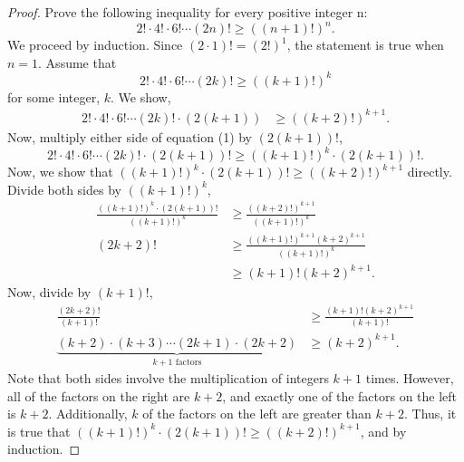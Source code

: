 \documentclass[12pt]{article}
\begin{document}
    \begin{proof}{Prove the following inequality for every positive integer n:\begin{equation*}
        2!\cdot4!\cdot6!\cdots(2n)!\geq((n+1)!)^n.
    \end{equation*}}
        We proceed by induction. Since \((2\cdot1)!=(2!)^1\), the statement is true when \(n=1\). Assume that
        \begin{equation}
            2!\cdot4!\cdot6!\cdots(2k)!\geq((k+1)!)^k
        \end{equation}
        for some integer, \(k\). We show,
        \begin{equation*}
            \begin{split}
                2!\cdot4!\cdot6!\cdots(2k)!\cdot(2(k+1))&\geq((k+2)!)^{k+1}.
            \end{split}
        \end{equation*}
        Now, multiply either side of equation (1) by \((2(k+1))!\),
        \begin{equation*}
            2!\cdot4!\cdot6!\cdots(2k)!\cdot(2(k+1))!\geq((k+1)!)^k\cdot(2(k+1))!.
        \end{equation*}
        Now, we show that \(((k+1)!)^k\cdot(2(k+1))!\geq((k+2)!)^{k+1}\) directly. Divide both sides by \(((k+1)!)^k\),
        \begin{equation*}
            \begin{split}
                \frac{((k+1)!)^k\cdot(2(k+1))!}{((k+1)!)^k}&\geq\frac{((k+2)!)^{k+1}}{((k+1)!)^k}\\
                (2k+2)! &\geq \frac{((k+1)!)^{k+1}(k+2)^{k+1}}{((k+1)!)^{k}}\\
                &\geq (k+1)!(k+2)^{k+1}.
            \end{split}
        \end{equation*}
        Now, divide by \((k+1)!\),
        \begin{equation*}
            \begin{split}
                \frac{(2k+2)!}{(k+1)!}&\geq \frac{(k+1)!(k+2)^{k+1}}{(k+1)!}\\
                \underbrace{(k+2)\cdot(k+3)\cdots(2k+1)\cdot(2k+2)}_{k+1\text{ factors}} & \geq (k+2)^{k+1}.
            \end{split}
        \end{equation*}
        Note that both sides involve the multiplication of integers \(k+1\) times. However, all of the factors on the right are \(k+2\), and exactly one of the factors on the left is \(k+2\). Additionally, \(k\) of the factors on the left are greater than \(k+2\). Thus, it is true that \(((k+1)!)^k\cdot(2(k+1))!\geq((k+2)!)^{k+1}\), and by induction.
    \end{proof}
\end{document}
